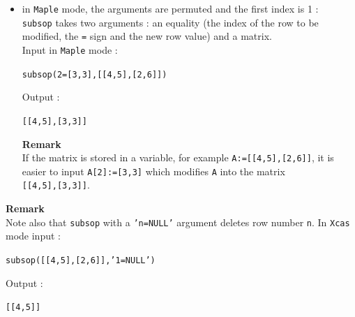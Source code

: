 \documentclass[a4paper,11pt]{book}
\begin{document}
\begin{enumerate}
\begin{itemize}
\item  in {\tt Maple} mode, the arguments are permuted and the first index
is 1 :\\ 
{\tt subsop} takes two arguments : an 
equality (the index of the row to be modified, the {\tt =} sign and the new 
row value) and a matrix.\\ 
Input in {\tt Maple} mode :
\begin{center}{\tt subsop(2=[3,3],[[4,5],[2,6]])}\end{center}
Output :
\begin{center}{\tt [[4,5],[3,3]]}\end{center}
{\bf Remark}\\
If the matrix is stored in a variable, for example 
{\tt A:=[[4,5],[2,6]]}, it is easier to input {\tt A[2]:=[3,3]} which modifies
{\tt A} into the matrix\\ {\tt [[4,5],[3,3]]}.
\end{itemize}
\end{enumerate}
{\bf Remark}\\
Note also that {\tt subsop} with a {\tt 'n=NULL'} argument 
deletes row number {\tt n}.
In {\tt Xcas} mode input :
\begin{center}{\tt subsop([[4,5],[2,6]],'1=NULL')}\end{center}
Output :
\begin{center}{\tt [[4,5]]}\end{center}
\end{document}
